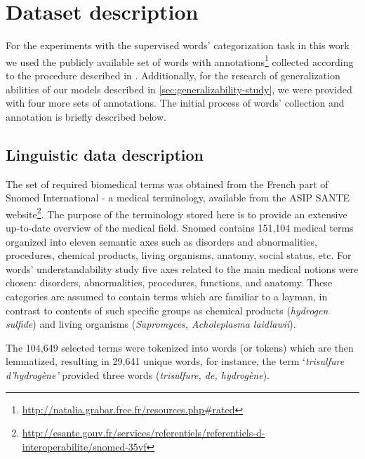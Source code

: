 \chapter{Dataset description}
\label{ch:dataset-description}

For the experiments with the supervised words' categorization task in this work we used the publicly available set of words with annotations\footnote{\url{http://natalia.grabar.free.fr/resources.php\#rated}} collected according to the procedure described in \citep{Grabar-PITR2014}. Additionally, for the research of generalization abilities of our models described in \ref{sec:generalizability-study}, we were provided with four more sets of annotations.
The initial process of words' collection and annotation is briefly described below.

\section{Linguistic data description}
\label{sec:linguistic-data-description}

The set of required biomedical terms was obtained from the French part of Snomed International \citep{Cote-93} - a medical terminology, available from the ASIP SANTE website\footnote{\url{http://esante.gouv.fr/services/referentiels/referentiels-d-interoperabilite/snomed-35vf}}. The purpose of the terminology stored here is to provide an extensive up-to-date overview of the medical field. Snomed contains 151,104 medical terms organized into eleven semantic axes such as disorders and abnormalities, procedures, chemical products, living organisms, anatomy, social status, etc. For words' understandability study five axes related to the main medical notions were chosen: disorders, abnormalities, procedures, functions, and anatomy. These categories are assumed to contain terms which are familiar to a layman, in contrast to contents of such specific groups as chemical products (\textit{hydrogen sulfide}) and living organisms (\textit{Sapromyces, Acholeplasma laidlawii}).

The 104,649 selected terms were tokenized into words (or tokens) which are then lemmatized, resulting in 29,641 unique words, for instance, the term `\textit{trisulfure d'hydrog\`{e}ne'} provided three words (\textit{trisulfure, de, hydrog\`{e}ne}).


